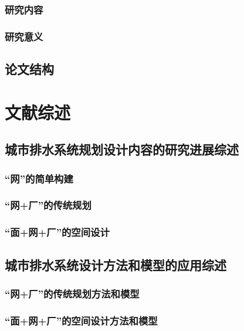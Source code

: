 \documentclass[degree=doctor]{thuthesis}
\begin{document}
\subsection{研究内容}
\subsection{研究意义}

\clearpage
\setcounter{page}{9}
\section{论文结构}


\clearpage
\setcounter{page}{11}
\chapter{文献综述}
\section{城市排水系统规划设计内容的研究进展综述}
\subsection{“网”的简单构建}

\clearpage
\setcounter{page}{12}
\subsection{“网+厂”的传统规划}

\clearpage
\setcounter{page}{15}
\subsection{“面+网+厂”的空间设计}

\clearpage
\setcounter{page}{18}
\section{城市排水系统设计方法和模型的应用综述}
\subsection{“网+厂”的传统规划方法和模型}

\clearpage
\setcounter{page}{23}
\subsection{“面+网+厂”的空间设计方法和模型}
\end{document}
